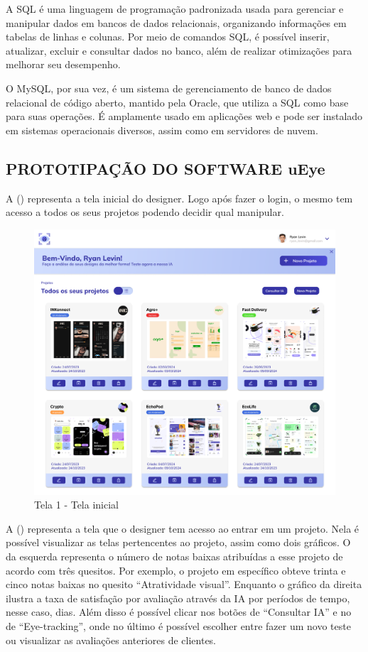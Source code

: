 A SQL é uma linguagem de programação padronizada usada para gerenciar e manipular dados em bancos de dados relacionais, organizando informações em tabelas de linhas e colunas. Por meio de comandos SQL, é possível inserir, atualizar, excluir e consultar dados no banco, além de realizar otimizações para melhorar seu desempenho.

O MySQL, por sua vez, é um sistema de gerenciamento de banco de dados relacional de código aberto, mantido pela Oracle, que utiliza a SQL como base para suas operações. É amplamente usado em aplicações web e pode ser instalado em sistemas operacionais diversos, assim como em servidores de nuvem. \textcite{Amazon}\newline

\subsection*{PROTOTIPAÇÃO DO SOFTWARE uEye}
A () representa a tela inicial do designer. Logo após fazer o login, o mesmo tem acesso a todos os seus projetos podendo decidir qual manipular.

\begin{figure}[H]
    \centering
    \caption{Tela 1 - Tela inicial}%
    \label{fig:pg-tela1}
    \includegraphics[width=0.72\linewidth]{Illustrations/tela1.png}
\end{figure}

A () representa a tela que o designer tem acesso ao entrar em um projeto. Nela é possível visualizar as telas pertencentes ao projeto, assim como dois gráficos. O da esquerda representa o número de notas baixas atribuídas a esse projeto de acordo com três quesitos. Por exemplo, o projeto em específico obteve trinta e cinco notas baixas no quesito “Atratividade visual”. Enquanto o gráfico da direita ilustra a taxa de satisfação por avaliação através da IA por períodos de tempo, nesse caso, dias. Além disso é possível clicar nos botões de “Consultar IA” e no de “Eye-tracking”, onde no último é possível escolher entre fazer um novo teste ou visualizar as avaliações anteriores de clientes.

